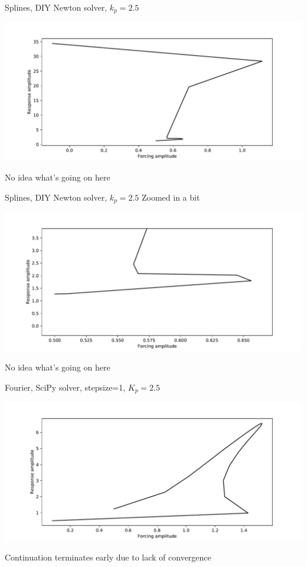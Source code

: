 \documentclass[presentation]{beamer}
\begin{document}
\begin{frame}[label={sec:org1fcdf10}]{Splines, DIY Newton solver, \(k_p=2.5\)}
\begin{center}
\includegraphics[width=.9\linewidth]{./kp2d5_transtime100_newton.pdf}
\end{center}

No idea what's going on here
\end{frame}

\begin{frame}[label={sec:orge75ca48}]{Splines, DIY Newton solver, \(k_p=2.5\)}
\alert{Zoomed in a bit}

\begin{center}
\includegraphics[width=.9\linewidth]{./kp2d5_transtime100_newton_zoom.pdf}
\end{center}

No idea what's going on here
\end{frame}

\begin{frame}[label={sec:orga4286d5}]{Fourier, SciPy solver, stepsize=1, \(K_p=2.5\)}
\begin{center}
\includegraphics[width=.9\linewidth]{./kp2d5_transtime100_scipy_fourier.pdf}
\end{center}

Continuation terminates early due to lack of convergence
\end{frame}
\end{document}
